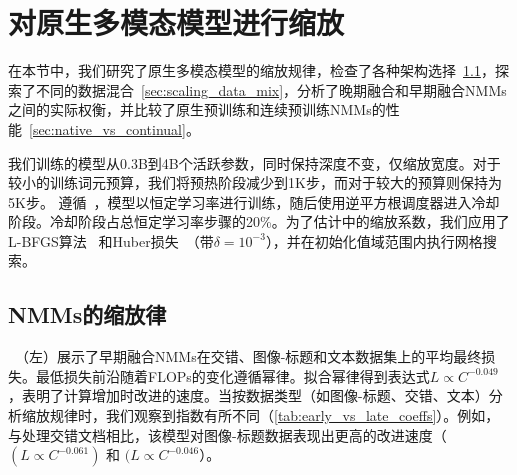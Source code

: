 





 











\section{对原生多模态模型进行缩放}








在本节中，我们研究了原生多模态模型的缩放规律，检查了各种架构选择~\cref{sec:scaling_laws_early}，探索了不同的数据混合~\cref{sec:scaling_data_mix}，分析了晚期融合和早期融合NMMs之间的实际权衡，并比较了原生预训练和连续预训练NMMs的性能~\cref{sec:native_vs_continual}。  

 我们训练的模型从0.3B到4B个活跃参数，同时保持深度不变，仅缩放宽度。对于较小的训练词元预算，我们将预热阶段减少到1K步，而对于较大的预算则保持为5K步。  
遵循~\citet{hagele2024scaling}，模型以恒定学习率进行训练，随后使用逆平方根调度器进入冷却阶段。冷却阶段占总恒定学习率步骤的20\%。为了估计中的缩放系数，我们应用了L-BFGS算法~\citep{lbfgs} 和Huber损失~\citep{Huber1992}（带$\delta =
10^{-3}$），并在初始化值域范围内执行网格搜索。  







       






\vspace{-0.5cm}
\subsection{NMMs的缩放律}
\label{sec:scaling_laws_early}

~（左）展示了早期融合NMMs在交错、图像-标题和文本数据集上的平均最终损失。最低损失前沿随着FLOPs的变化遵循幂律。拟合幂律得到表达式$L \propto C^{-0.049}$，表明了计算增加时改进的速度。当按数据类型（如图像-标题、交错、文本）分析缩放规律时，我们观察到指数有所不同（\cref{tab:early_vs_late_coeffs}）。例如，与处理交错文档相比，该模型对图像-标题数据表现出更高的改进速度（$(L \propto C^{-0.061})$ 和 $(L \propto C^{-0.046}$）。  

